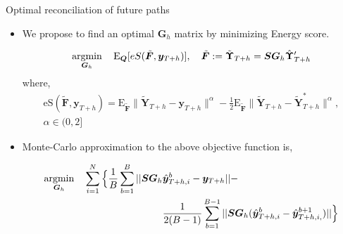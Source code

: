 \documentclass[11pt,xcolor=dvipsnames,table]{beamer} %
\def\E{\text{E}}
\begin{document}
\begin{frame}{Optimal reconciliation of future paths}
\begin{itemize}[<+-| alert@+>]
	\item We propose to find an optimal $\bm{G}_h$ matrix by minimizing Energy score. 
	
	\begin{equation*}
	\operatornamewithlimits{argmin}_{\bm{G}_h} \quad \E_{\bm{Q}}[eS(\tilde{\bm{F}}, \bm{y}_{T+h})], \quad  \tilde{\bm{F}} := \tilde{\bm{\Upsilon}}_{T+h} = \bm{SG}_h\hat{\bm{\Upsilon}}'_{T+h}
	\end{equation*}
	where, \begin{align*}
	\text{eS}(\tilde{\bm{F}},\bm{y}_{T+h}) = 
	\E_{\tilde{\bm{F}}}
	\|\tilde{\bm{Y}}_{T+h}-\bm{y}_{T+h}\|^\alpha -
	\frac{1}{2}\E_{\tilde{\bm{F}}}\|\tilde{\bm{Y}}_{T+h}-\tilde{\bm{Y}}^*_{T+h}\|^\alpha,\\ \alpha \in (0,2]
	\end{align*}
	\item Monte-Carlo approximation to the above objective function is, 
	
	\begin{block}{}
		\begin{align*}
		\operatornamewithlimits{argmin}_{\bm{G}_h} \quad \sum_{i=1}^{N}\Big\{\frac{1}{B}\sum_{b=1}^{B}||\bm{SG}_h&\hat{\bm{y}}_{T+h,i}^b -\bm{y}_{T+h}||-\\
		&\frac{1}{2(B-1)}\sum_{b=1}^{B-1}||\bm{SG}_h(\hat{\bm{y}}_{T+h,i}^b -\hat{\bm{y}}_{T+h,i,}^{b+1})||\Big\}
		\end{align*}
	\end{block}
\end{itemize}
\end{frame}
\end{document}
